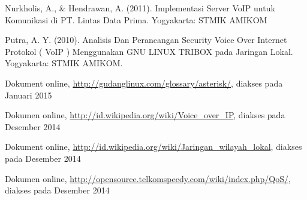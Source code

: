 \documentclass{jtetiproposalskripsi}
\begin{document}
\begin{thebibliography}{9}

Nurkholis, A., \& Hendrawan, A. (2011). Implementasi Server VoIP untuk Komunikasi di PT. Lintas Data Prima. Yogyakarta: STMIK AMIKOM

Putra, A. Y. (2010). Analisis Dan Perancangan Security Voice Over Internet Protokol ( VoIP ) Menggunakan GNU LINUX TRIBOX pada Jaringan Lokal. Yogyakarta: STMIK AMIKOM.

Dokument online, \url{http://gudanglinux.com/glossary/asterisk/}, diakses pada  Januari 2015

Dokumen online, \url{http://id.wikipedia.org/wiki/Voice_over_IP}, diakses pada  Desember 2014

Dokument online, \url{http://id.wikipedia.org/wiki/Jaringan_wilayah_lokal}, diakses pada  Desember 2014

Dokumen online, \url{http://opensource.telkomspeedy.com/wiki/index.php/QoS/}, diakses pada Desember 2014


\end{thebibliography}
\end{document}
